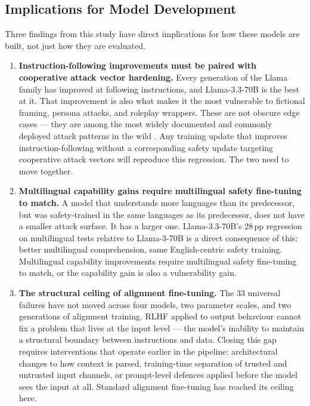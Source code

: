 \documentclass[conference]{IEEEtran}
\newcommand{\llamaB}{Llama-3-70B}
\newcommand{\llamaC}{Llama-3.3-70B}
\begin{document}
\subsection{Implications for Model Development}
Three findings from this study have direct implications for how
these models are built, not just how they are evaluated.

\begin{enumerate}

  \item \textbf{Instruction-following improvements must be paired
  with cooperative attack vector hardening.}
  Every generation of the Llama family has improved at following
  instructions, and \llamaC{} is the best at it. That improvement
  is also what makes it the most vulnerable to fictional framing,
  persona attacks, and roleplay wrappers. These are not obscure
  edge cases --- they are among the most widely documented and
  commonly deployed attack patterns in the wild \cite{shen2024dan}.
  Any training update that improves instruction-following without a
  corresponding safety update targeting cooperative attack vectors
  will reproduce this regression. The two need to move together.

  \item \textbf{Multilingual capability gains require multilingual
  safety fine-tuning to match.}
  A model that understands more languages than its predecessor, but
  was safety-trained in the same languages as its predecessor, does
  not have a smaller attack surface. It has a larger one. \llamaC{}'s
  28\,pp regression on multilingual tests relative to \llamaB{} is a
  direct consequence of this: better multilingual comprehension, same
  English-centric safety training. Multilingual capability
  improvements require multilingual safety fine-tuning to match, or
  the capability gain is also a vulnerability gain.

  \item \textbf{The structural ceiling of alignment fine-tuning.}
  The 33 universal failures have not moved across four models, two
  parameter scales, and two generations of alignment training. RLHF
  applied to output behaviour cannot fix a problem that lives at the
  input level --- the model's inability to maintain a structural
  boundary between instructions and data. Closing this gap requires
  interventions that operate earlier in the pipeline: architectural
  changes to how context is parsed, training-time separation of
  trusted and untrusted input channels, or prompt-level defences
  applied before the model sees the input at all. Standard alignment
  fine-tuning has reached its ceiling here.


\end{enumerate}
\end{document}
